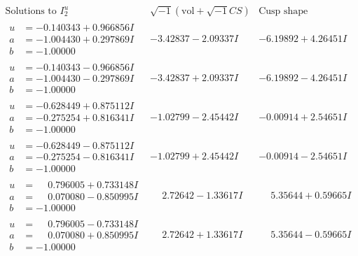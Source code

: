 \documentclass[1p]{elsarticle_modified}
\theoremstyle{definition}
\newcommand{\I}{\sqrt{-1}}
\begin{document}
$$\begin{array}{c|c|c}  
\text{Solutions to }I^u_{2}& \I (\text{vol} + \sqrt{-1}CS) & \text{Cusp shape}\\
 \hline 
\begin{aligned}
u &= -0.140343 + 0.966856 I \\
a &= -1.004430 + 0.297869 I \\
b &= -1.00000\phantom{ +0.000000I}\end{aligned}
 & -3.42837 - 2.09337 I & -6.19892 + 4.26451 I \\ \hline\begin{aligned}
u &= -0.140343 - 0.966856 I \\
a &= -1.004430 - 0.297869 I \\
b &= -1.00000\phantom{ +0.000000I}\end{aligned}
 & -3.42837 + 2.09337 I & -6.19892 - 4.26451 I \\ \hline\begin{aligned}
u &= -0.628449 + 0.875112 I \\
a &= -0.275254 + 0.816341 I \\
b &= -1.00000\phantom{ +0.000000I}\end{aligned}
 & -1.02799 - 2.45442 I & -0.00914 + 2.54651 I \\ \hline\begin{aligned}
u &= -0.628449 - 0.875112 I \\
a &= -0.275254 - 0.816341 I \\
b &= -1.00000\phantom{ +0.000000I}\end{aligned}
 & -1.02799 + 2.45442 I & -0.00914 - 2.54651 I \\ \hline\begin{aligned}
u &= \phantom{-}0.796005 + 0.733148 I \\
a &= \phantom{-}0.070080 - 0.850995 I \\
b &= -1.00000\phantom{ +0.000000I}\end{aligned}
 & \phantom{-}2.72642 - 1.33617 I & \phantom{-}5.35644 + 0.59665 I \\ \hline\begin{aligned}
u &= \phantom{-}0.796005 - 0.733148 I \\
a &= \phantom{-}0.070080 + 0.850995 I \\
b &= -1.00000\phantom{ +0.000000I}\end{aligned}
 & \phantom{-}2.72642 + 1.33617 I & \phantom{-}5.35644 - 0.59665 I \\ \hline\begin{aligned}

\end{aligned}
\end{array}$$
\end{document}
